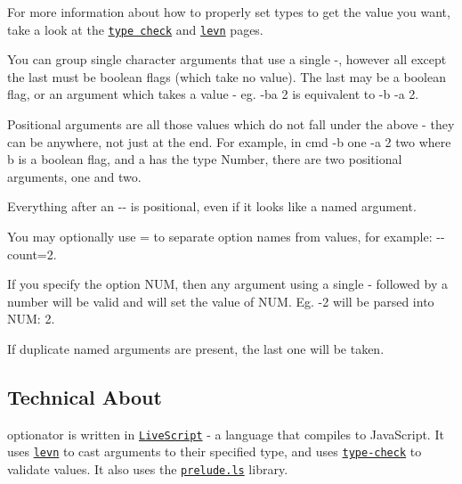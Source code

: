 For more information about how to properly set types to get the value you want, take a look at the \href{https://github.com/gkz/type-check}{\tt type check} and \href{https://github.com/gkz/levn}{\tt levn} pages.

You can group single character arguments that use a single {\ttfamily -\/}, however all except the last must be boolean flags (which take no value). The last may be a boolean flag, or an argument which takes a value -\/ eg. {\ttfamily -\/ba 2} is equivalent to {\ttfamily -\/b -\/a 2}.

Positional arguments are all those values which do not fall under the above -\/ they can be anywhere, not just at the end. For example, in {\ttfamily cmd -\/b one -\/a 2 two} where {\ttfamily b} is a boolean flag, and {\ttfamily a} has the type {\ttfamily Number}, there are two positional arguments, {\ttfamily one} and {\ttfamily two}.

Everything after an {\ttfamily -\/-\/} is positional, even if it looks like a named argument.

You may optionally use {\ttfamily =} to separate option names from values, for example\+: {\ttfamily -\/-\/count=2}.

If you specify the option {\ttfamily N\+UM}, then any argument using a single {\ttfamily -\/} followed by a number will be valid and will set the value of {\ttfamily N\+UM}. Eg. {\ttfamily -\/2} will be parsed into {\ttfamily N\+UM\+: 2}.

If duplicate named arguments are present, the last one will be taken.

\subsection*{Technical About}

{\ttfamily optionator} is written in \href{http://livescript.net/}{\tt Live\+Script} -\/ a language that compiles to Java\+Script. It uses \href{https://github.com/gkz/levn}{\tt levn} to cast arguments to their specified type, and uses \href{https://github.com/gkz/type-check}{\tt type-\/check} to validate values. It also uses the \href{http://preludels.com/}{\tt prelude.\+ls} library. 